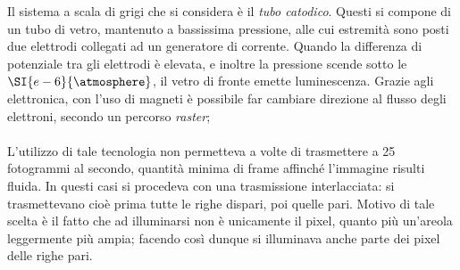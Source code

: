 \documentclass{subfiles}
\begin{document}
Il sistema a scala di grigi che si considera è il \emph{tubo catodico}.
Questi si compone di un tubo di vetro, mantenuto a bassissima pressione, alle cui estremità sono posti due elettrodi collegati ad un generatore di corrente.
Quando la differenza di potenziale tra gli elettrodi è elevata, e inoltre la pressione scende sotto le \(\SI{e-6}{\atmosphere}\), il vetro di fronte emette luminescenza.
Grazie agli elettronica, con l'uso di magneti è possibile far cambiare direzione al flusso degli elettroni, secondo un percorso \emph{raster\footnotemark[2]};
\\ \\
L'utilizzo di tale tecnologia non permetteva a volte di trasmettere a 25 fotogrammi al secondo, quantità minima di frame affinché l'immagine risulti fluida.
In questi casi si procedeva con una trasmissione interlacciata: si trasmettevano cioè prima tutte le righe dispari, poi quelle pari.
Motivo di tale scelta è il fatto che ad illuminarsi non è unicamente il pixel, quanto più un'areola leggermente più ampia;
facendo così dunque si illuminava anche parte dei pixel delle righe pari.

\end{document}
